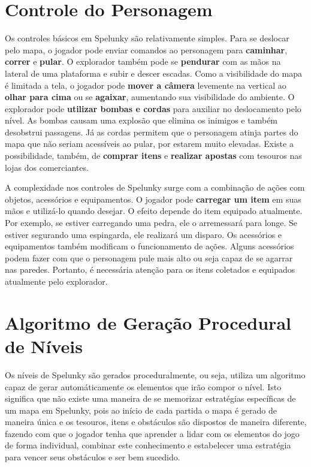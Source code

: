 \section{\label{section:spelunky-controls}Controle do Personagem}
Os controles básicos em Spelunky são relativamente simples. Para se deslocar
pelo mapa, o jogador pode enviar comandos ao personagem para \textbf{caminhar},
\textbf{correr} e \textbf{pular}. O explorador também pode se \textbf{pendurar}
com as mãos na lateral de uma plataforma e subir e descer escadas. Como a
visibilidade do mapa é limitada a tela, o jogador pode \textbf{mover a câmera}
levemente na vertical ao \textbf{olhar para cima} ou se \textbf{agaixar},
aumentando sua visibilidade do ambiente. O explorador pode \textbf{utilizar
bombas e cordas} para auxiliar no deslocamento pelo nível. As bombas causam uma
explosão que elimina os inimigos e também desobstrui passagens. Já as cordas
permitem que o personagem atinja partes do mapa que não seriam acessíveis ao
pular, por estarem muito elevadas. Existe a possibilidade, também, de
\textbf{comprar itens} e \textbf{realizar apostas} com tesouros nas lojas dos
comerciantes.

A complexidade nos controles de Spelunky surge com a combinação de ações com
objetos, acessórios e equipamentos. O jogador pode \textbf{carregar um
item} em suas mãos e utilizá-lo quando desejar. O efeito depende do item
equipado atualmente. Por exemplo, se estiver carregando uma pedra, ele o
arremessará para longe. Se estiver segurando uma espingarda, ele realizará um
disparo. Os acessórios e equipamentos também modificam o funcionamento de ações.
Alguns acessórios podem fazer com que o personagem pule mais alto ou seja capaz
de se agarrar nas paredes. Portanto, é necessária atenção para os itens
coletados e equipados atualmente pelo explorador.


\section{\label{section:spelunky-procgen}Algoritmo de Geração Procedural de
Níveis}
Os níveis de Spelunky são gerados proceduralmente, ou seja, utiliza
um algoritmo capaz de gerar automáticamente os elementos que irão compor o
nível. Isto significa que não existe uma maneira de se memorizar estratégias
específicas de um mapa em Spelunky, pois ao início de cada partida o mapa é
gerado de maneira única e os tesouros, itens e obstáculos são dispostos de
maneira diferente, fazendo com que o jogador tenha que aprender a lidar com os
elementos do jogo de forma individual, combinar este conhecimento e estabelecer
uma estratégia para vencer seus obstáculos e ser bem sucedido.


